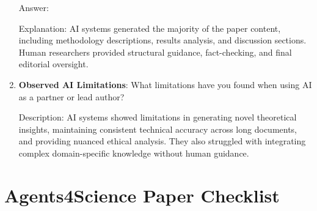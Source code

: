 \documentclass{article}
\begin{document}
\begin{enumerate}
    Answer: \involvementC{} 
    
    Explanation: AI systems generated the majority of the paper content, including methodology descriptions, results analysis, and discussion sections. Human researchers provided structural guidance, fact-checking, and final editorial oversight.

    \item \textbf{Observed AI Limitations}: What limitations have you found when using AI as a partner or lead author? 

     
    Description: AI systems showed limitations in generating novel theoretical insights, maintaining consistent technical accuracy across long documents, and providing nuanced ethical analysis. They also struggled with integrating complex domain-specific knowledge without human guidance.
\end{enumerate}

\newpage

\section*{Agents4Science Paper Checklist}
\end{document}
